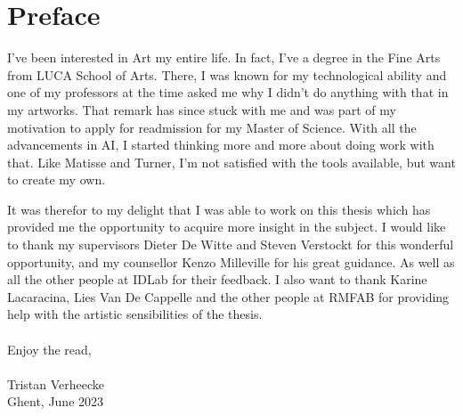 \chapter*{Preface}

I've been interested in Art my entire life. In fact, I've a degree in the Fine Arts from LUCA School of Arts.
There, I was known for my technological ability and one of my professors at the time asked me why I didn't do anything with that in my artworks.
That remark has since stuck with me and was part of my motivation to apply for readmission for my Master of Science.
With all the advancements in AI, I started thinking more and more about doing work with that.
Like Matisse and Turner, I'm not satisfied with the tools available, but want to create my own.

It was therefor to my delight that I was able to work on this thesis which has provided me the opportunity to acquire more insight in the subject.
I would like to thank my supervisors Dieter De Witte and Steven Verstockt for this wonderful opportunity,
and my counsellor Kenzo Milleville for his great guidance. As well as all the other people at IDLab for their feedback.
I also want to thank Karine Lacaracina, Lies Van De Cappelle and the other people at RMFAB for providing help with the artistic sensibilities of the thesis.
\\
\\
Enjoy the read,
\\
\\
Tristan Verheecke\\
Ghent, June 2023